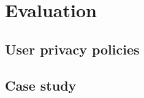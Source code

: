 \documentclass[thesis.tex]{subfiles}
\begin{document}
\chapter{Evaluation}

\section{User privacy policies}

\section{Case study}
\end{document}
